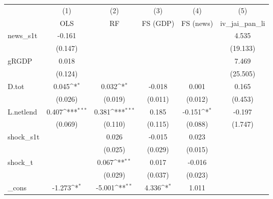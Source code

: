 {
\def\sym#1{\ifmmode^{#1}\else\(^{#1}\)\fi}
\begin{tabular}{l*{5}{c}}
\toprule
            &\multicolumn{1}{c}{(1)}&\multicolumn{1}{c}{(2)}&\multicolumn{1}{c}{(3)}&\multicolumn{1}{c}{(4)}&\multicolumn{1}{c}{(5)}\\
            &\multicolumn{1}{c}{OLS}&\multicolumn{1}{c}{RF}&\multicolumn{1}{c}{FS (GDP)}&\multicolumn{1}{c}{FS (news)}&\multicolumn{1}{c}{iv\_jai\_pan\_li}\\
\midrule
news\_s1t    &      -0.161         &                     &                     &                     &       4.535         \\
            &     (0.147)         &                     &                     &                     &    (19.133)         \\
\addlinespace
gRGDP       &       0.018         &                     &                     &                     &       7.469         \\
            &     (0.124)         &                     &                     &                     &    (25.505)         \\
\addlinespace
D.tot       &       0.045\sym{*}  &       0.032\sym{*}  &      -0.018         &       0.001         &       0.165         \\
            &     (0.026)         &     (0.019)         &     (0.011)         &     (0.012)         &     (0.453)         \\
\addlinespace
L.netlend   &       0.407\sym{***}&       0.381\sym{***}&       0.185         &      -0.151\sym{*}  &      -0.197         \\
            &     (0.069)         &     (0.110)         &     (0.115)         &     (0.088)         &     (1.747)         \\
\addlinespace
shock\_s1t   &                     &       0.026         &      -0.015         &       0.023         &                     \\
            &                     &     (0.025)         &     (0.029)         &     (0.015)         &                     \\
\addlinespace
shock\_t     &                     &       0.067\sym{**} &       0.017         &      -0.016         &                     \\
            &                     &     (0.029)         &     (0.037)         &     (0.023)         &                     \\
\addlinespace
\_cons      &      -1.273\sym{*}  &      -5.001\sym{**} &       4.336\sym{*}  &       1.011         &                     \\

\end{tabular}}
